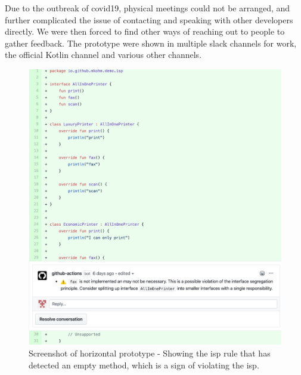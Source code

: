 \documentclass{report}
\begin{document}
Due to the outbreak of \gls{covid19}, physical meetings could not be arranged, and further complicated the issue of contacting and speaking with other developers directly. We were then forced to find other ways of reaching out to people to gather feedback. The prototype were shown in multiple slack channels for work, the official Kotlin channel and various other channels.

\begin{figure}[h!]
    \centering
    \includegraphics[width=\textwidth]{images/final_isp.png}
    \caption{Screenshot of horizontal prototype - Showing the \gls{isp} rule that has detected an empty method, which is a sign of violating the \gls{isp}.}
    \label{fig:horizontal-prototype}
\end{figure}
\end{document}
